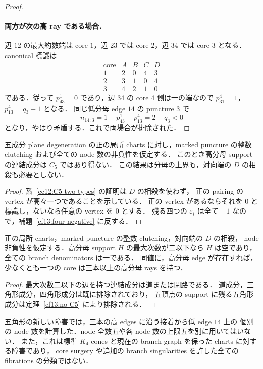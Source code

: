 \begin{proof}
\paragraph{両方が次の高 ray である場合．}
辺 $12$ の最大約数端は core $1$，辺 $23$ では core $2$，辺 $34$ では core $3$ となる．
canonical 標識は
\[
\begin{array}{c|rrrr}
\text{core}&A&B&C&D\\ \hline
1&2&0&4&3\\
2&3&1&0&4\\
3&4&2&1&0
\end{array}
\]
である．従って $p^1_{43}=0$ であり，辺 $34$ の core $4$ 側は一の端なので
$p^4_{31}=1$，$p^4_{13}=q_3-1$ となる．
同じ低分母 edge $14$ の puncture $3$ で
\begin{equation}\label{cf13:negative-node-backward}
 n_{14;3}=1-p^1_{43}-p^4_{13}=2-q_3<0
\end{equation}
となり，やはり矛盾する．これで両場合が排除された．
\end{proof}

\begin{theorem}[五角形成分の完全排除]
\label{cf13:no-C5}
五成分 plane degeneration の正の局所 charts に対し，marked puncture の整数 clutching
および全ての node 数の非負性を仮定する．
このとき高分母 support の連結成分は $C_5$ ではあり得ない．
この結果は分母の上界も，対向端の $D$ の相殺も必要としない．
\end{theorem}

\begin{proof}
系~\ref{cc12:C5-two-types} の証明は $D$ の相殺を使わず，
正の pairing の vertex が高々一つであることを示している．
正の vertex があるならそれを $0$ と標識し，ないなら任意の vertex を $0$ とする．
残る四つの $\varepsilon_i$ は全て $-1$ なので，補題~\ref{cf13:four-negative} に反する．
\end{proof}

\begin{corollary}[五次の次数二以下の分母剛性]
\label{cf13:degree-two-rigidity}
正の局所 charts，marked puncture の整数 clutching，対向端の $D$ の相殺，
node 非負性を仮定する．高分母 support $H$ の最大次数が二以下なら $H$ は空であり，
全ての branch denominators は一である．
同値に，高分母 edge が存在すれば，少なくとも一つの core は三本以上の高分母 rays を持つ．
\end{corollary}

\begin{proof}
最大次数二以下の辺を持つ連結成分は道または閉路である．
道成分，三角形成分，四角形成分は既に排除されており，
五頂点の support に残る五角形成分は定理~\ref{cf13:no-C5} により排除される．
\end{proof}

五角形の新しい障害では，三本の高 edges に沿う接着から低 edge $14$ 上の
個別の node 数を計算した．node 全数五や各 node 数の上限五を別に用いてはいない．
また，これは標準 $K_4$ cones と現在の branch graph を保った charts に対する障害であり，
core surgery や追加の branch singularities を許した全ての fibrations の分類ではない．
